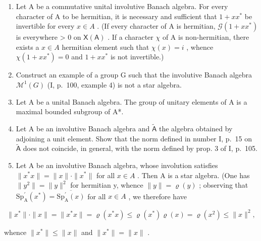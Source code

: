 \begin{enumerate}
\def\labelenumi{\arabic{enumi})}
\setcounter{enumi}{6}
\item
  Let A be a commutative unital involutive Banach algebra. For every character of A to be hermitian, it is necessary and sufficient that \(1 + xx^{*}\) be invertible for every \(x \in A\) . (If every character of A is hermitian, \(\mathcal{G}(1 + xx^{*})\) is everywhere \textgreater{} 0 on \(\mathsf{X}(\mathsf{A})\) . If a character \(\chi\) of A is non-hermitian, there exists a \(x \in A\) hermitian element such that \(\chi(x) = i\) , whence \(\chi(1 + xx^{*}) = 0\) and \(1 + xx^{*}\) is not invertible.)
\item
  Construct an example of a group G such that the involutive Banach algebra \(\mathcal{M}^{1}(G)\) (I, p.~100, example 4) is not a star algebra.
\item
  Let A be a unital Banach algebra. The group of unitary elements of A is a maximal bounded subgroup of A*.
\item
  Let A be an involutive Banach algebra and \(\widetilde{\mathsf{A}}\) the algebra obtained by adjoining a unit element. Show that the norm defined in number I, p.~15 on \(\widetilde{\mathsf{A}}\) does not coincide, in general, with the norm defined by prop. 3 of I, p.~105.
\item
  Let A be an involutive Banach algebra, whose involution satisfies \(\|x^{*}x\| = \|x\| \cdot \|x^{*}\|\) for all \(x \in A\) . Then A is a star algebra. (One has \(\|y^{2}\| = \|y\|^{2}\) for hermitian y, whence \(\|y\| = \varrho(y)\) ; observing that \(\mathrm{Sp}_{\mathrm{A}}^{\prime}(x^{*}) = \overline{\mathrm{Sp}_{\mathrm{A}}^{\prime}(x)}\) for all \(x \in A\) , we therefore have
\end{enumerate}

\[
\| x ^ {*} \| \cdot \| x \| = \| x ^ {*} x \| = \varrho (x ^ {*} x) \leqslant \varrho (x ^ {*}) \varrho (x) = \varrho (x ^ {2}) \leqslant \| x \| ^ {2},
\]

whence \(\|x^{*}\|\leqslant\|x\|\) and \(\|x^{*}\|=\|x\|\) .

